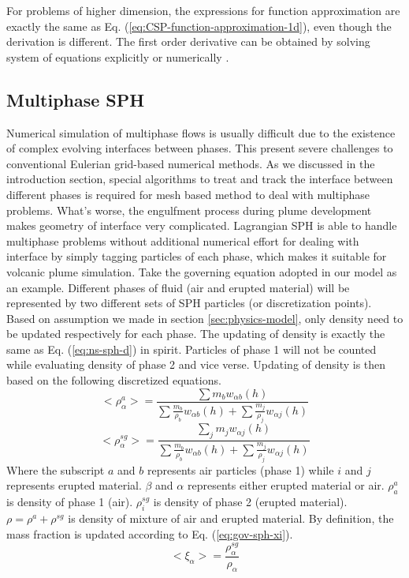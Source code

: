 \documentclass[journal abbreviation, manuscript]{copernicus}
\begin{document}
For problems of higher dimension, the expressions for function approximation are exactly the same as Eq. (\ref{eq:CSP-function-approximation-1d}), even though the derivation is different. The first order derivative can be obtained by solving system of equations explicitly or numerically \citep{chen1999improvement}.

\subsection{Multiphase SPH}
Numerical simulation of multiphase flows is usually difficult due to the existence of complex evolving interfaces between phases.  This present severe challenges to conventional Eulerian grid-based numerical methods. As we discussed in the introduction section, special algorithms to treat and track the interface between different phases is required for mesh based method to deal with multiphase problems. What's worse, the engulfment process during plume development makes geometry of interface very complicated. Lagrangian SPH is able to handle multiphase problems without additional numerical effort for dealing with interface by simply tagging particles of each phase, which makes it suitable for volcanic plume simulation. Take the governing equation adopted in our model as an example. Different phases of fluid (air and erupted material) will be represented by two different sets of SPH particles (or discretization points). Based on assumption we made in section \ref{sec:physics-model}, only density need to be updated respectively for each phase. The updating of density is exactly the same as Eq. (\ref{eq:ns-sph-d}) in spirit.  Particles of phase 1 will not be counted while evaluating density of phase 2 and vice verse. Updating of density is then based on the following discretized equations.
\begin{equation}
<\rho_{\alpha}^a>=\frac{\sum m_b w_{\alpha b} (h)}{\sum \frac{m_b}{\rho_b} w_{\alpha b} (h) +\sum \frac{m_j}{\rho_j} w_{\alpha j} (h)} \label{eq:gov-sph-d1}
\end{equation}
\begin{equation}
<\rho_\alpha^{sg}>=\frac{\sum_j m_j w_{\alpha j} (h)}{\sum \frac{m_b}{\rho_b} w_{\alpha b} (h) +\sum \frac{m_j}{\rho_j} w_{\alpha j} (h)} \label{eq:gov-sph-d2}
\end{equation}
Where the subscript $a$ and $b$ represents air particles (phase 1) while $i$ and $j$ represents erupted material. $\beta$ and $\alpha$ represents either erupted material or air.
$\rho_a^a$ is density of phase 1 (air). 
 $\rho_i^{sg}$ is density of phase 2 (erupted material).
$\rho=\rho^a + \rho^{sg}$ is density of mixture of air and erupted material. By definition, the mass fraction is updated according to Eq. (\ref{eq:gov-sph-xi}).
\begin{equation}
<\xi_{\alpha}> = \dfrac{\rho^{sg}_{\alpha}}{\rho_{\alpha}}
\label{eq:gov-sph-xi}
\end{equation}
\end{document}
